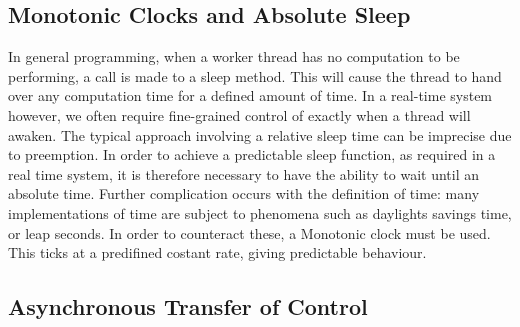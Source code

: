 \subsection{Monotonic Clocks and Absolute Sleep}
In general programming, when a worker thread has no computation to be 
performing, a call is made to a sleep method. This will cause the thread
to hand over any computation time for a defined amount of time. In a 
real-time system however, we often require fine-grained control of exactly
when a thread will awaken. The typical approach involving a relative sleep 
time can be imprecise due to preemption. In order to achieve a predictable 
sleep function, as required in a real time system, it is therefore necessary 
to have the ability to wait until an absolute time. Further complication 
occurs with the definition of time: many implementations of time are subject 
to phenomena such as daylights savings time, or leap seconds. 
In order to counteract these, a Monotonic clock must be used. This ticks at a 
predifined costant rate, giving predictable behaviour. 

\subsection{Asynchronous Transfer of Control}

